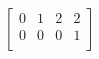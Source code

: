 \documentclass{article}
\begin{document}
 $
\left[
\begin{array}{c|c|c|c}
0 & 1 & 2 & 2 \\
0 & 0 & 0 & 1 \\
\end{array}
\right] $
\end{document}

